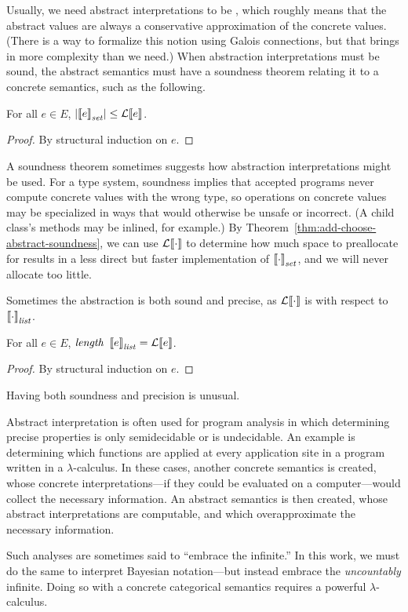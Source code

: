 Usually, we need abstract interpretations to be , which roughly means that the abstract values are always a conservative approximation of the concrete values.
(There is a way to formalize this notion using Galois connections, but that brings in more complexity than we need.)
When abstraction interpretations must be sound, the abstract semantics must have a soundness theorem relating it to a concrete semantics, such as the following.

\begin{theorem}
\label{thm:add-choose-abstract-soundness}
For all $e \in E$, $\left|\left\llbracket{e}\right\rrbracket_\mathit{set}\right| \leq \mathcal{L}\!\left\llbracket{e}\right\rrbracket$.
\end{theorem}
\begin{proof}
By structural induction on $e$.
\end{proof}

A soundness theorem sometimes suggests how abstraction interpretations might be used.
For a type system, soundness implies that accepted programs never compute concrete values with the wrong type, so operations on concrete values may be specialized in ways that would otherwise be unsafe or incorrect.
(A child class's methods may be inlined, for example.)
By Theorem~\ref{thm:add-choose-abstract-soundness}, we can use $\mathcal{L}\!\left\llbracket{\cdot}\right\rrbracket$ to determine how much space to preallocate for results in a less direct but faster implementation of $\left\llbracket{\cdot}\right\rrbracket_\mathit{set}$, and we will never allocate too little.

Sometimes the abstraction is both sound and precise, as $\mathcal{L}\!\left\llbracket{\cdot}\right\rrbracket$ is with respect to $\left\llbracket{\cdot}\right\rrbracket_\mathit{list}$.

\begin{theorem}
For all $e \in E$, $\mathit{length}~\left\llbracket{e}\right\rrbracket_\mathit{list} = \mathcal{L}\!\left\llbracket{e}\right\rrbracket$.
\end{theorem}
\begin{proof}
By structural induction on $e$.
\end{proof}

Having both soundness and precision is unusual.

Abstract interpretation is often used for program analysis in which determining precise properties is only semidecidable or is undecidable.
An example is determining which functions are applied at every application site in a program written in a $\lambda$-calculus.
In these cases, another concrete semantics is created, whose concrete interpretations---if they could be evaluated on a computer---would collect the necessary information.
An abstract semantics is then created, whose abstract interpretations are computable, and which overapproximate the necessary information.

Such analyses are sometimes said to ``embrace the infinite.''
In this work, we must do the same to interpret Bayesian notation---but instead embrace the \emph{uncountably} infinite.
Doing so with a concrete categorical semantics requires a powerful $\lambda$-calculus.
